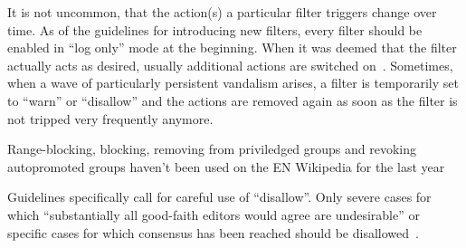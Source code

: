 \documentclass{sigchi}
\begin{document}
It is not uncommon, that the action(s) a particular filter triggers change over time.
As of the guidelines for introducing new filters, every filter should be enabled in ``log only'' mode at the beginning.
When it was deemed that the filter actually acts as desired, usually additional actions are switched on~\cite{Wikipedia:EditFilterInstructions}.
Sometimes, when a wave of particularly persistent vandalism arises, a filter is temporarily set to ``warn'' or ``disallow'' and the actions are removed again as soon as the filter is not tripped very frequently anymore. %

Range-blocking, blocking, removing from priviledged groups and revoking autopromoted groups haven't been used on the EN Wikipedia for the last year %

Guidelines specifically call for careful use of ``disallow''.
Only severe cases for which ``substantially all good-faith editors would agree are undesirable'' or specific cases for which consensus has been reached should be disallowed~\cite{Wikipedia:EditFilter}.
\end{document}
